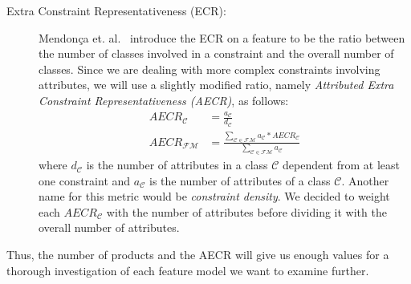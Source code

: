 \begin{description}
 \item[Extra Constraint Representativeness (ECR):] Mendon\c{c}a et. al.~\cite[p.~2]{ecr} introduce the ECR on a feature to be the ratio between the number of classes involved in a constraint and the overall number of classes. Since we are dealing with more complex constraints involving attributes, we will use a slightly modified ratio, namely \emph{Attributed Extra Constraint Representativeness (AECR)}, as follows:
 \begin{align}
  AECR_{\mathcal{C}} &= \frac{a_{\mathcal{C}}}{d_{\mathcal{C}}} \\
  AECR_{\mathcal{FM}} &= \frac{\sum\limits_{\mathcal{C} \in \mathcal{FM}} a_{\mathcal{C}}*AECR_{\mathcal{C}}} {\sum\limits_{\mathcal{C} \in \mathcal{FM}} a_{\mathcal{C}}}
 \end{align}
 where $d_{\mathcal{C}}$ is the number of attributes in a class $\mathcal{C}$ dependent from at least one constraint and $a_{\mathcal{C}}$ is the number of attributes of a class $\mathcal{C}$. Another name for this metric would be  \emph{constraint density}. We decided to weight each $AECR_{\mathcal{C}}$ with the number of attributes before dividing it with the overall number of attributes.
\end{description}

Thus, the number of products and the AECR will give us enough values for a thorough investigation of each feature model we want to examine further.

%
%
%


